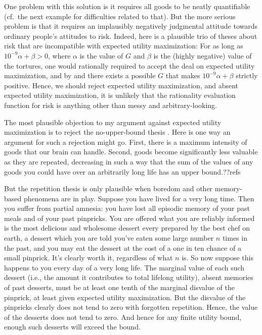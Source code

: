 One problem with this solution is it requires all goods to be neatly
quantifiable (cf.\ the next example for difficulties related to that). But the more serious problem is that it requires an
implausibly negatively judgmental attitude towards ordinary people's attitudes to risk.
Indeed, here is a plausible trio of theses about risk that are incompatible with expected utility maximization:
For as long as $10^{-9}\alpha + \beta>0$, where $\alpha$ is the value of $G$ and $\beta$ is the (highly negative)
value of the tortures, one would rationally required to accept the deal on expected utility maximization, and by 
and  there exists a possible $G$ that makes $10^{-9}\alpha + \beta$ strictly positive.
Hence, we should reject expected utility maximization, and absent expected utility maximization, it is unlikely that the rationality 
evaluation function for risk is anything other than messy and arbitrary-looking.

The most plausible objection to my argument against expected utility maximization is to reject the no-upper-bound thesis .
Here is one way an argument for such a rejection might go. First, there is a maximum intensity of goods that our brain can handle.
Second, goods become significantly less valuable as they are repeated, decreasing in such a way that the sum of the values of any 
goods you could have over an arbitrarily long life has an upper bound.??refs

But the repetition thesis is only plausible when boredom and other memory-based phenomena are in play. Suppose you have 
lived for a very long time. Then you suffer from partial amnesia: you have
lost all episodic memory of your past meals and of your past pinpricks. You are offered what you are reliably informed is 
the most delicious and wholesome dessert every prepared by the best chef on earth, a dessert  which you are told you've eaten some large 
number $n$ times in the past, and you may eat the dessert at the cost of a one in ten chance of a small pinprick. It's clearly worth it,
regardless of what $n$ is. So now suppose this happens to you every day of a very long life. The marginal value of each such 
dessert (i.e., the amount it contributes to total lifelong utility), absent memories of past desserts, must  be at least one 
tenth of the marginal disvalue of the pinprick, at least given expected  utility maximization. But the disvalue of the pinpricks 
clearly does not tend to zero with forgotten repetition. Hence, the value of the desserts does not tend to zero. And hence for any
finite utility bound, enough such desserts will exceed the bound.

